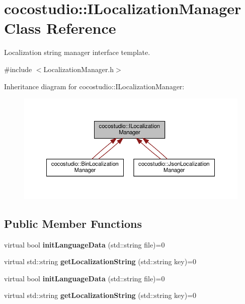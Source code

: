 \hypertarget{classcocostudio_1_1ILocalizationManager}{}\section{cocostudio\+:\+:I\+Localization\+Manager Class Reference}
\label{classcocostudio_1_1ILocalizationManager}


Localization string manager interface template.  




{\ttfamily \#include $<$Localization\+Manager.\+h$>$}



Inheritance diagram for cocostudio\+:\+:I\+Localization\+Manager\+:
\nopagebreak
\begin{figure}[H]
\begin{center}
\leavevmode
\includegraphics[width=350pt]{classcocostudio_1_1ILocalizationManager__inherit__graph}
\end{center}
\end{figure}
\subsection*{Public Member Functions}
\begin{DoxyCompactItemize}
\item 
\mbox{\label{classcocostudio_1_1ILocalizationManager_aa44664f260ad773804f416a7c9e6e1e2}} 
virtual bool {\bfseries init\+Language\+Data} (std\+::string file)=0
\item 
\mbox{\label{classcocostudio_1_1ILocalizationManager_aedba65b8e840bee79b724aff388f0f39}} 
virtual std\+::string {\bfseries get\+Localization\+String} (std\+::string key)=0
\item 
\mbox{\label{classcocostudio_1_1ILocalizationManager_aa44664f260ad773804f416a7c9e6e1e2}} 
virtual bool {\bfseries init\+Language\+Data} (std\+::string file)=0
\item 
\mbox{\label{classcocostudio_1_1ILocalizationManager_aedba65b8e840bee79b724aff388f0f39}} 
virtual std\+::string {\bfseries get\+Localization\+String} (std\+::string key)=0
\end{DoxyCompactItemize}



